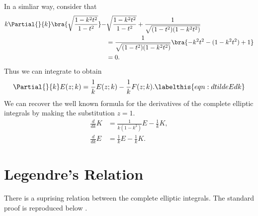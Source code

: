 In a simliar way, consider that
\begin{align*}
k\Partial{}{k}\bra{\sqrt{\frac{1-k^2t^2}{1-t^2}}} -& \sqrt{\frac{1-k^2t^2}{1-t^2}} + \frac{1}{\sqrt{(1-t^2)(1-k^2 t^2)}} \\
&= \frac{1}{\sqrt{(1-t^2)(1-k^2 t^2)}}\bra{-k^2t^2 - (1-k^2t^2) + 1} \\
&= 0.
\end{align*}
Thus we can integrate to obtain
\[
\Partial{}{k}E(z;k) = \frac{1}{k}E(z;k) - \frac{1}{k}F(z;k). \labelthis{eqn:dtildeEdk}
\]
We can recover the well known formula for the derivatives of the complete elliptic integrals by making the substitution $z=1$.
\begin{align}
\frac{d}{dk}K &= \frac{1}{k(1-k^2)}E - \frac{1}{k}K, \label{eqn:dKdk}\\
\frac{d}{dk}E &= \frac{1}{k}E - \frac{1}{k} K. \label{eqn:dEdk}
\end{align}














\section{Legendre's Relation}
\label{sec:Legendre's Relation}
There is a suprising relation between the complete elliptic integrals. The standard proof is reproduced below .

